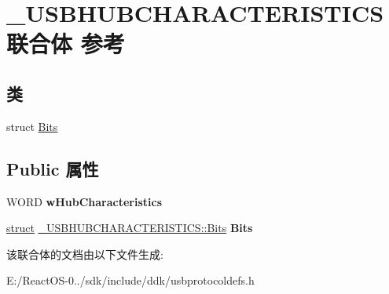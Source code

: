 \hypertarget{union___u_s_b_h_u_b_c_h_a_r_a_c_t_e_r_i_s_t_i_c_s}{}\section{\+\_\+\+U\+S\+B\+H\+U\+B\+C\+H\+A\+R\+A\+C\+T\+E\+R\+I\+S\+T\+I\+C\+S联合体 参考}
\label{union___u_s_b_h_u_b_c_h_a_r_a_c_t_e_r_i_s_t_i_c_s}
\subsection*{类}
\begin{DoxyCompactItemize}
\item 
struct \hyperlink{struct___u_s_b_h_u_b_c_h_a_r_a_c_t_e_r_i_s_t_i_c_s_1_1_bits}{Bits}
\end{DoxyCompactItemize}
\subsection*{Public 属性}
\begin{DoxyCompactItemize}
\item 
\mbox{\label{union___u_s_b_h_u_b_c_h_a_r_a_c_t_e_r_i_s_t_i_c_s_ab6d964fc4fc70f1d3e9c575bae2ef21b}} 
W\+O\+RD {\bfseries w\+Hub\+Characteristics}
\item 
\mbox{\label{union___u_s_b_h_u_b_c_h_a_r_a_c_t_e_r_i_s_t_i_c_s_aa7d71a209fd3f5712e0e68d9ac20f0c9}} 
\hyperlink{interfacestruct}{struct} \hyperlink{struct___u_s_b_h_u_b_c_h_a_r_a_c_t_e_r_i_s_t_i_c_s_1_1_bits}{\+\_\+\+U\+S\+B\+H\+U\+B\+C\+H\+A\+R\+A\+C\+T\+E\+R\+I\+S\+T\+I\+C\+S\+::\+Bits} {\bfseries Bits}
\end{DoxyCompactItemize}


该联合体的文档由以下文件生成\+:\begin{DoxyCompactItemize}
\item 
E\+:/\+React\+O\+S-\/0../sdk/include/ddk/usbprotocoldefs.\+h\end{DoxyCompactItemize}
